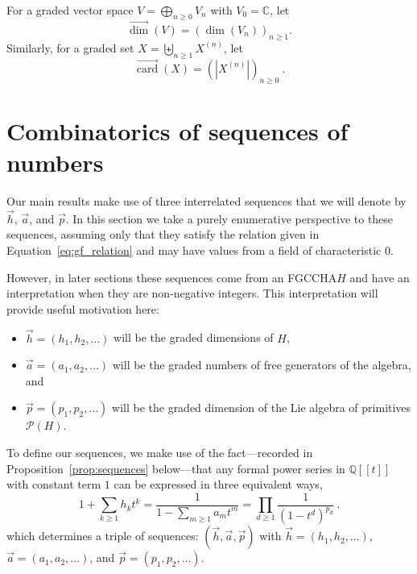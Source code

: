 \documentclass[11pt]{amsart}
\theoremstyle{definition}
\numberwithin{equation}{section}
\def\CC{{\mathbb C}}
\def\QQ{{\mathbb Q}}
\newcommand{\FGCCHA}{\textsf{FGCCHA}\xspace}
\newcommand{\vecdim}{\overrightarrow{\dim}}
\newcommand{\veccard}{\overrightarrow{\operatorname{card}}}
\newcommand{\lucas}[1]{\todo[size=\tiny,color=red!50]{#1 \\ \hfill --- Lucas}}
\begin{document}

For a graded vector space $V = \bigoplus_{n \ge 0} V_{n}$ with $V_{0} = \CC$, let
\[
\vecdim(V) = \left( \dim(V_{n}) \right)_{n \ge 1}.
\]
Similarly, for a graded set $X = \biguplus_{n \ge 1} X^{(n)}$, let
\[
\veccard(X) = \left( |X^{(n)}| \right)_{n \ge 0}~.
\]

\section{Combinatorics of sequences of numbers}
\label{sec:SequencePrelims}

Our main results make use of three interrelated sequences that we will denote by $\vec{h}$, $\vec{a}$, and $\vec{p}$.  
In this section we take a purely enumerative perspective to these sequences, assuming only that they satisfy the relation given in Equation~\eqref{eq:gf_relation} and may have values from a field of characteristic $0$.

However, in later sections these sequences come from an \FGCCHA $H$ and have an interpretation when they are non-negative integers.
This interpretation will provide useful motivation here:
\begin{itemize}
\item $\vec{h} = (h_{1}, h_{2}, \ldots)$ will be the graded dimensions of $H$,

\item $\vec{a} = (a_{1}, a_{2}, \ldots)$ will be the graded numbers of free generators of the algebra, and 

\item $\vec{p} = (p_{1}, p_{2}, \ldots)$ will be the graded dimension of the Lie algebra of primitives $\mathcal{P}(H)$.

\end{itemize}

To define our sequences, we make use of the fact---recorded in Proposition~\ref{prop:sequences}
below---that any formal power series in $\QQ[\![t]\!]$ with constant term $1$
can be expressed in three equivalent ways,
\begin{equation}
\label{eq:gf_relation}
1 + \sum_{k \geq 1} h_k t^k = \frac{1}{1 - \sum_{m \geq 1} a_m t^m} = \prod_{d \geq 1} \frac{1}{(1-t^d)^{p_d}}~.
\end{equation}
which determines a triple of sequences: $(\vec{h}, \vec{a}, \vec{p})$ with $\vec{h} = (h_{1}, h_{2}, \ldots)$, $\vec{a} = (a_{1}, a_{2}, \ldots)$, and $\vec{p} = (p_{1}, p_{2}, \ldots)$.
\end{document}
